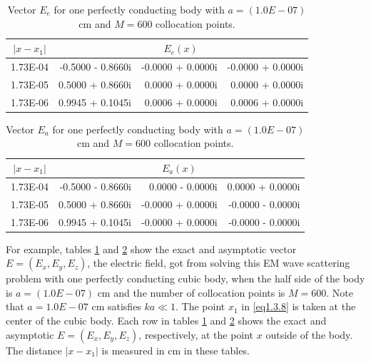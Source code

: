 \documentclass[12pt]{article}
\numberwithin{equation}{section}
\begin{document}
\begin{table}[htb]
  \centering
  \caption{Vector $E_e$ for one perfectly conducting body with $a=(1.0E-07)$ cm and $M=600$ collocation points.}
    \begin{tabular}{crrr}
    \toprule
    $|x-x_1|$ & \multicolumn{3}{c}{$E_e(x)$} \\
    \midrule
    		1.73E-04 & -0.5000 - 0.8660i & -0.0000 + 0.0000i & -0.0000 + 0.0000i \\
    	    1.73E-05 & 0.5000 + 0.8660i & 0.0000 + 0.0000i & 0.0000 + 0.0000i \\
    	    1.73E-06 & 0.9945 + 0.1045i & 0.0006 + 0.0000i & 0.0006 + 0.0000i \\
    \bottomrule
    \end{tabular}%
  \label{tab3.3.1}%
\end{table}%
\begin{table}[htb]
  \centering
  \caption{Vector $E_a$ for one perfectly conducting body with $a=(1.0E-07)$ cm and $M=600$ collocation points.}
    \begin{tabular}{crrr}
    \toprule
    $|x-x_1|$ & \multicolumn{3}{c}{$E_a(x)$} \\
    \midrule
    		1.73E-04 & -0.5000 - 0.8660i & 0.0000 - 0.0000i & 0.0000 + 0.0000i \\
    	    1.73E-05 & 0.5000 + 0.8660i & -0.0000 + 0.0000i  & -0.0000 - 0.0000i \\
    	    1.73E-06 & 0.9945 + 0.1045i & -0.0000 + 0.0000i  & -0.0000 - 0.0000i \\    	
    \bottomrule
    \end{tabular}%
  \label{tab3.3.2}%
\end{table}%
For example, tables \ref{tab3.3.1} and \ref{tab3.3.2} show the exact and asymptotic vector $E=(E_x,E_y,E_z)$, the electric field, got from solving this EM wave scattering problem with one perfectly conducting cubic body, when the half side of the body is $a=(1.0E-07)$ cm and the number of collocation points is $M=600$. Note that $a=1.0E-07$ cm satisfies $ka \ll 1$. The point $x_1$ in \eqref{eq1.3.8} is taken at the center of the cubic body. Each row in tables \ref{tab3.3.1} and \ref{tab3.3.2} shows the exact and asymptotic $E=(E_x,E_y,E_z)$, respectively, at the point $x$ outside of the body. The distance $|x-x_1|$ is measured in cm in these tables.
\end{document}
